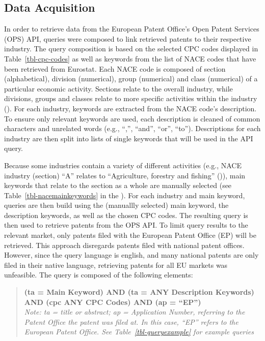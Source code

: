 \documentclass[
  11,
  a4paperpaper,
]{article}
\begin{document}

\subsection{Data Acquisition}\label{sec-data-acquisition}

In order to retrieve data from the European Patent Office's Open Patent
Services (OPS) API, queries were composed to link retrieved patents to
their respective industry. The query composition is based on the
selected CPC codes displayed in Table~\ref{tbl-cpc-codes} as well as
keywords from the list of NACE codes that have been retrieved from
Eurostat. Each NACE code is composed of section (alphabetical), division
(numerical), group (numerical) and class (numerical) of a particular
economic activity. Sections relate to the overall industry, while
divisions, groups and classes relate to more specific activities within
the industry (). For each
industry, keywords are extracted from the NACE code's description. To
ensure only relevant keywords are used, each description is cleaned of
common characters and unrelated words (e.g., ``,'', ``and'', ``or'',
``to''). Descriptions for each industry are then split into lists of
single keywords that will be used in the API query.

Because some industries contain a variety of different activities (e.g.,
NACE industry (section) ``A'' relates to ``Agriculture, forestry and
fishing'' ()),
main keywords that relate to the section as a whole are manually
selected (see Table~\ref{tbl-nacemainkeywords} in the
). For each industry and main keyword, queries are
then build using the (manuallly selected) main keyword, the description
keywords, as well as the chosen CPC codes. The resulting query is then
used to retrieve patents from the OPS API. To limit query results to the
relevant market, only patents filed with the European Patent Office (EP)
will be retrieved. This approach disregards patents filed with national
patent offices. However, since the query language is english, and many
national patents are only filed in their native language, retrieving
patents for all EU markets was unfeasible. The query is composed of the
following elements:


\begin{quote}
\textbf{(ta = Main Keyword) AND (ta = ANY Description Keywords) AND (cpc
ANY CPC Codes) AND (ap = ``EP'')}\\
\emph{Note: ta = title or abstract; ap = Application Number, referring
to the Patent Office the patent was filed at. In this case, ``EP''
refers to the European Patent Office. See Table~\ref{tbl-queryexample}
for example queries}
\end{quote}
\end{document}
